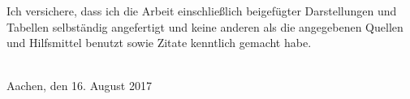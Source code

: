 
Ich versichere, dass ich die Arbeit einschließlich beigefügter Darstellungen und Tabellen selbständig angefertigt und keine anderen als die angegebenen Quellen und Hilfsmittel benutzt sowie Zitate kenntlich gemacht habe. 

\vspace{3cm}

\theauthor \\
Aachen, den 16. August 2017